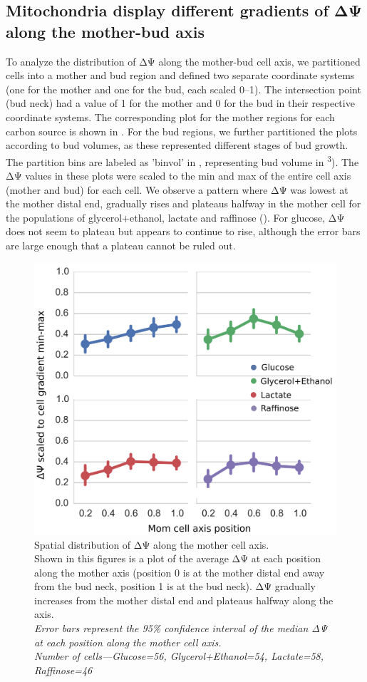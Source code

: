 \subsection{Mitochondria display different gradients of ΔΨ along the mother-bud axis}
To analyze the distribution of ΔΨ along the mother-bud cell axis, we partitioned cells into a mother and bud region and defined two separate coordinate systems (one for the mother and one for the bud, each scaled 0--1). The intersection point (bud neck) had a value of 1 for the mother and 0 for the bud in their respective coordinate systems. The corresponding plot for the mother regions for each carbon source is shown in . For the bud regions, we further partitioned the plots according to bud volumes, as these represented different stages of bud growth. The partition bins are labeled as 'binvol' in , representing bud volume in \si{\micron\cubed}). The ΔΨ values in these plots were scaled to the min and max of the entire cell axis (mother and bud) for each cell. We observe a pattern where ΔΨ was lowest at the mother distal end, gradually rises and plateaus halfway in the mother cell for the populations of glycerol+ethanol, lactate and raffinose (). For glucose,  ΔΨ does not seem to plateau but appears to continue to rise, although the error bars are large enough that a plateau cannot be ruled out.
%
\begin{figure}[htp]
	\centering
    \includegraphics[width=.52\textwidth]{aldymom}
    \caption[Spatial distribution of ΔΨ along the mother cell axis]{Spatial distribution of ΔΨ along the mother cell axis.\\Shown in this figures is a plot of the average ΔΨ at each position along the mother axis (position 0 is at the mother distal end away from the bud neck, position 1 is at the bud neck). ΔΨ gradually increases from the mother distal end and plateaus halfway along the axis.\\\emph{Error bars represent the 95\% confidence interval of the median ΔΨ at each position along the mother cell axis.\\Number of cells---Glucose=56, Glycerol+Ethanol=54, Lactate=58, Raffinose=46}}\label{fig:aldymom}
\end{figure}
%

